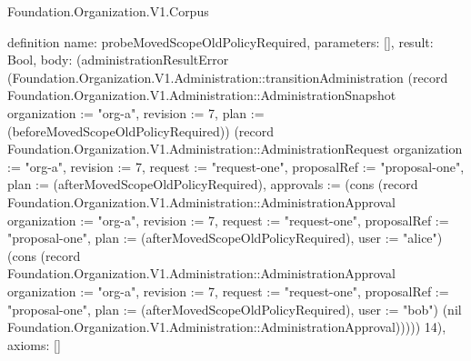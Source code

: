 \begin{lexlean}{Foundation.Organization.V1.Corpus}
\begin{semanticmodule}
definition{
  name: probeMovedScopeOldPolicyRequired,
  parameters: [],
  result: Bool,
  body: (administrationResultError (Foundation.Organization.V1.Administration::transitionAdministration (record Foundation.Organization.V1.Administration::AdministrationSnapshot {organization := "org-a", revision := 7, plan := (beforeMovedScopeOldPolicyRequired)}) (record Foundation.Organization.V1.Administration::AdministrationRequest {organization := "org-a", revision := 7, request := "request-one", proposalRef := "proposal-one", plan := (afterMovedScopeOldPolicyRequired), approvals := (cons (record Foundation.Organization.V1.Administration::AdministrationApproval {organization := "org-a", revision := 7, request := "request-one", proposalRef := "proposal-one", plan := (afterMovedScopeOldPolicyRequired), user := "alice"}) (cons (record Foundation.Organization.V1.Administration::AdministrationApproval {organization := "org-a", revision := 7, request := "request-one", proposalRef := "proposal-one", plan := (afterMovedScopeOldPolicyRequired), user := "bob"}) (nil Foundation.Organization.V1.Administration::AdministrationApproval)))})) 14),
  axioms: []
}


\end{semanticmodule}
\end{lexlean}

